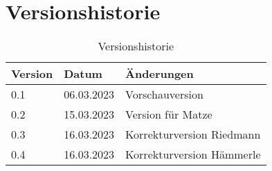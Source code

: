 \section*{Versionshistorie}

\begin{table}[ht]
  \centering
  \begin{tabular}{|l|l|l|}
    \hline
    \textbf{Version} & \textbf{Datum} & \textbf{Änderungen}       \\ \hline
    0.1              & 06.03.2023     & Vorschauversion           \\ \hline
    0.2              & 15.03.2023     & Version für Matze         \\ \hline
    0.3              & 16.03.2023     & Korrekturversion Riedmann \\ \hline
    0.4              & 16.03.2023     & Korrekturversion Hämmerle \\ \hline
  \end{tabular}
  \caption{Versionshistorie}
  \label{tab:versionshistorie}
\end{table}